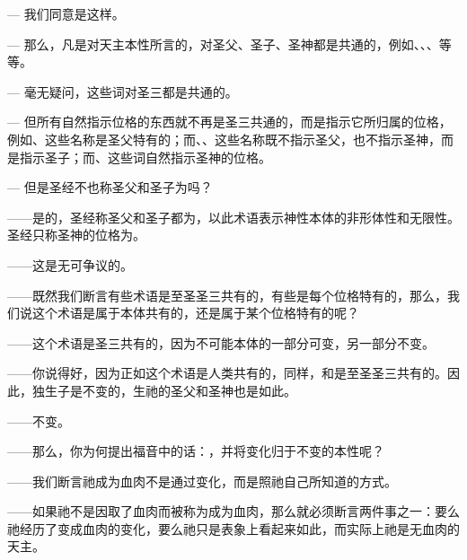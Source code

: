— 我们同意是这样。\par

— 那么，凡是对天主本性所言的，对圣父、圣子、圣神都是共通的，例如、、、等等。\par

— 毫无疑问，这些词对圣三都是共通的。\par

— 但所有自然指示位格的东西就不再是圣三共通的，而是指示它所归属的位格，例如、这些名称是圣父特有的；而、、这些名称既不指示圣父，也不指示圣神，而是指示圣子；而、这些词自然指示圣神的位格。\par

— 但是圣经不也称圣父和圣子为吗？\par

——是的，圣经称圣父和圣子都为，以此术语表示神性本体的非形体性和无限性。圣经只称圣神的位格为。\par

——这是无可争议的。\par

——既然我们断言有些术语是至圣圣三共有的，有些是每个位格特有的，那么，我们说这个术语是属于本体共有的，还是属于某个位格特有的呢？\par

——这个术语是圣三共有的，因为不可能本体的一部分可变，另一部分不变。\par

——你说得好，因为正如这个术语是人类共有的，同样，和是至圣圣三共有的。因此，独生子是不变的，生祂的圣父和圣神也是如此。\par

——不变。\par

——那么，你为何提出福音中的话：，并将变化归于不变的本性呢？\par

——我们断言祂成为血肉不是通过变化，而是照祂自己所知道的方式。\par

——如果祂不是因取了血肉而被称为成为血肉，那么就必须断言两件事之一：要么祂经历了变成血肉的变化，要么祂只是表象上看起来如此，而实际上祂是无血肉的天主。\par

